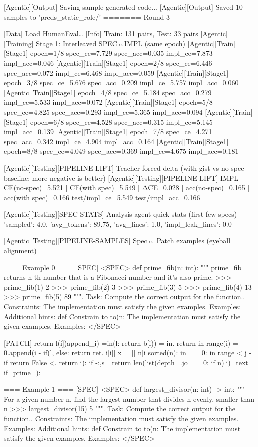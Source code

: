 [Agentic][Output] Saving sample generated code...
[Agentic][Output] Saved 10 samples to 'preds_static_role/'
=======
Round 3

[Data] Load HumanEval…
[Info] Train: 131 pairs, Test: 33 pairs
[Agentic][Training] Stage 1: Interleaved SPEC↔IMPL (same epoch)
[Agentic][Train][Stage1] epoch=1/8 spec_ce=7.729 spec_acc=0.035 impl_ce=7.873 impl_acc=0.046
[Agentic][Train][Stage1] epoch=2/8 spec_ce=6.446 spec_acc=0.072 impl_ce=6.468 impl_acc=0.059
[Agentic][Train][Stage1] epoch=3/8 spec_ce=5.676 spec_acc=0.209 impl_ce=5.757 impl_acc=0.060
[Agentic][Train][Stage1] epoch=4/8 spec_ce=5.184 spec_acc=0.279 impl_ce=5.533 impl_acc=0.072
[Agentic][Train][Stage1] epoch=5/8 spec_ce=4.825 spec_acc=0.293 impl_ce=5.365 impl_acc=0.094
[Agentic][Train][Stage1] epoch=6/8 spec_ce=4.528 spec_acc=0.315 impl_ce=5.145 impl_acc=0.139
[Agentic][Train][Stage1] epoch=7/8 spec_ce=4.271 spec_acc=0.342 impl_ce=4.904 impl_acc=0.164
[Agentic][Train][Stage1] epoch=8/8 spec_ce=4.049 spec_acc=0.369 impl_ce=4.675 impl_acc=0.181

[Agentic][Testing][PIPELINE-LIFT] Teacher-forced delta (with gist vs no-spec baseline; more negative is better)
[Agentic][Testing][PIPELINE-LIFT] IMPL CE(no-spec)=5.521 | CE(with spec)=5.549 | ΔCE=0.028 | acc(no-spec)=0.165 | acc(with spec)=0.166
test/impl_ce=5.549 test/impl_acc=0.166

[Agentic][Testing][SPEC-STATS] Analysis agent quick stats (first few specs)
{'sampled': 4.0, 'avg_tokens': 89.75, 'avg_lines': 1.0, 'impl_leak_lines': 0.0}

[Agentic][Testing][PIPELINE-SAMPLES] Spec↔ Patch examples (eyeball alignment)

=== Example 0 ===
[SPEC]
<SPEC> def prime_fib(n: int): """ prime_fib returns n-th number that is a Fibonacci number and it's also prime. >>> prime_fib(1) 2 >>> prime_fib(2) 3 >>> prime_fib(3) 5 >>> prime_fib(4) 13 >>> prime_fib(5) 89 """. Task: Compute the correct output for the function.. Constraints: The implementation must satisfy the given examples. Examples: Additional hints: def Constrain to to(n: The implementation must satisfy the given examples. Examples: </SPEC>

[PATCH]
return l(i])append_i) =in(l: return b[i)) = in. return in range(i) = 0.append(i - if(l, else: return ret. i[i][ x = [] n[i sorted(n): in == 0: in range < j - if return False <. return[i): if -:,s_ return len(list(depth=.jo == 0: if n)[i)_text if_prime_):

=== Example 1 ===
[SPEC]
<SPEC> def largest_divisor(n: int) -> int: """ For a given number n, find the largest number that divides n evenly, smaller than n >>> largest_divisor(15) 5 """. Task: Compute the correct output for the function.. Constraints: The implementation must satisfy the given examples. Examples: Additional hints: def Constrain to to(n: The implementation must satisfy the given examples. Examples: </SPEC>

